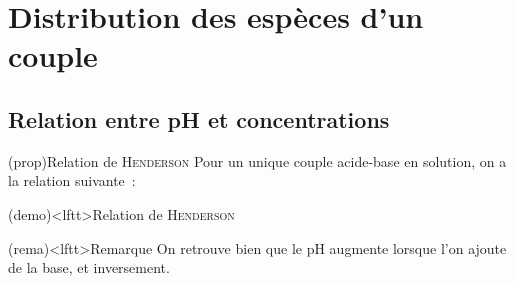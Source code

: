 \documentclass[../../main/main.tex]{subfiles}
\begin{document}
\section{Distribution des espèces d'un couple}
\subsection{Relation entre pH et concentrations}
\begin{tcb*}(prop){Relation de \textsc{Henderson}}
	Pour un unique couple acide-base en solution, on a la relation suivante~:
	\psw{
		\[
			\boxed{\pH = \pk + \log \frac{[\ce{A-}]}{[\ce{AH}]}}
		\]
	}
\end{tcb*}
\begin{tcb*}(demo)<lftt>{Relation de \textsc{Henderson}}
	\vspace{-15pt}
\end{tcb*}
\begin{tcb}(rema)<lftt>{Remarque}
	On retrouve bien que le pH augmente lorsque l'on ajoute de la base, et
	inversement.
\end{tcb}
\end{document}
